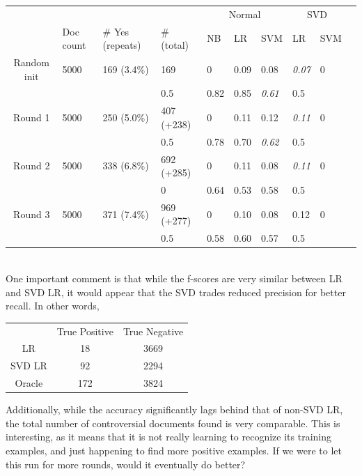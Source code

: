 \documentclass[11pt]{article} %
\begin{document}
\begin{tabular}{|c|*{9}{l|}}
\rowcolor{gray!50} & &&& \multicolumn{3}{|c|}{Normal} & \multicolumn{2}{|c|}{SVD} \\
\rowcolor{gray!50} & Doc count & \# Yes (repeats) & \# (total) & NB & LR & SVM &  LR & SVM \\
Random init & 5000 & 169 (3.4\%) & 169 & 0 & 0.09 & 0.08 & \emph{0.07} & 0 \\
	&	&	&	0.5 & 0.82 & 0.85 & \emph{0.61} & 0.5 \\
Round 1 & 5000 & 250 (5.0\%) & 407 (+238) & 0 & 0.11 & 0.12 & \emph{0.11} & 0 \\
	&	&	&	0.5 & 0.78 & 0.70 & \emph{0.62} & 0.5 \\
Round 2 & 5000 & 338 (6.8\%) & 692 (+285) & 0 & 0.11 & 0.08 & \emph{0.11} & 0 \\
	&	&	&	0 & 0.64 & 0.53 & 0.58 & 0.5 \\
Round 3 & 5000 & 371 (7.4\%) & 969 (+277) & 0 & 0.10 & 0.08 & 0.12 & 0 \\
	&	&	&	0.5 & 0.58 & 0.60 & 0.57 & 0.5 \\
\end{tabular}\\

One important comment is that while the f-scores are very similar between LR and SVD LR, it would appear that the SVD trades reduced precision for better recall. In other words, \\
\begin{center}
\begin{tabular}{c|c|c}
 & True Positive & True Negative \\
LR & 18 & 3669 \\
SVD LR & 92 & 2294 \\
Oracle & 172 & 3824 \\
\end{tabular}\end{center}

Additionally, while the accuracy significantly lags behind that of non-SVD LR, the total number of controversial documents found is very comparable. This is interesting, as it means that it is not really learning to recognize its training examples, and just happening to find more positive examples. If we were to let this run for more rounds, would it eventually do better?\\
\end{document}
